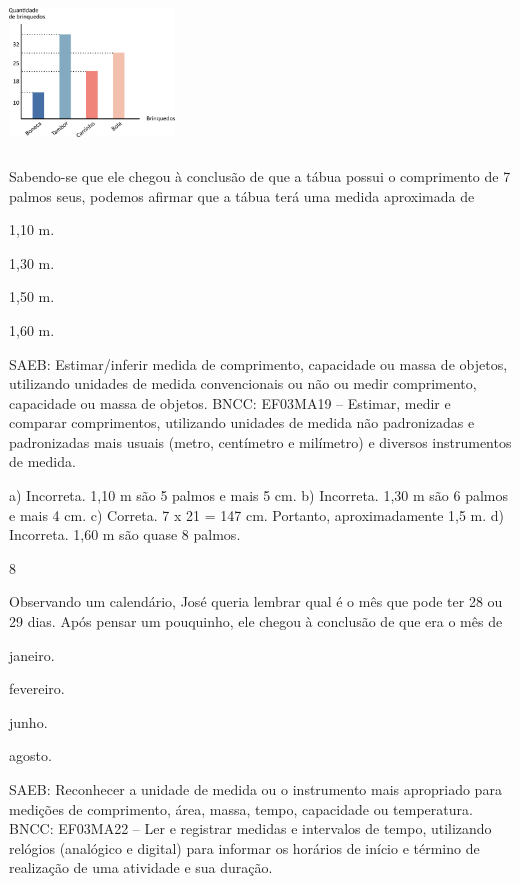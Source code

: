 {\begin{escolha}
{%

\includegraphics[width=1.73077in,height=1.57654in]{media/image119.png}

Sabendo-se que ele chegou à conclusão de que a tábua possui o comprimento de 7 palmos seus, podemos afirmar que a tábua terá uma medida aproximada de

\begin{escolha}
\item
  1,10 m.
\item
  1,30 m.
\item
  1,50 m.
\item
  1,60 m.
\end{escolha}

SAEB: Estimar/inferir medida de comprimento, capacidade ou massa de objetos, utilizando unidades de medida convencionais ou não ou medir comprimento, capacidade ou massa de objetos.
BNCC: EF03MA19 -- Estimar, medir e comparar comprimentos, utilizando unidades de medida
não padronizadas e padronizadas mais usuais (metro, centímetro e milímetro) e diversos
instrumentos de medida.

a) Incorreta. 1,10 m são 5 palmos e mais 5 cm.
b) Incorreta. 1,30 m são 6 palmos e mais 4 cm. 
c) Correta. 7 x 21 = 147 cm. Portanto, aproximadamente 1,5 m.
d) Incorreta. 1,60 m são quase 8 palmos.

\num{8}

Observando um calendário, José queria lembrar qual é o mês que pode ter 28 ou 29 dias. Após pensar um pouquinho, ele chegou à conclusão de que era o mês de

\begin{escolha}
\item
  janeiro.
\item
  fevereiro.
\item
  junho.
\item
  agosto.
\end{escolha}

SAEB: Reconhecer a unidade de medida ou o instrumento mais apropriado para medições de comprimento, área, massa, tempo, capacidade ou temperatura.
BNCC: EF03MA22 -- Ler e registrar medidas e intervalos de tempo, utilizando relógios (analógico e
digital) para informar os horários de início e término de realização de uma atividade e sua
duração.

}
\end{escolha}}
